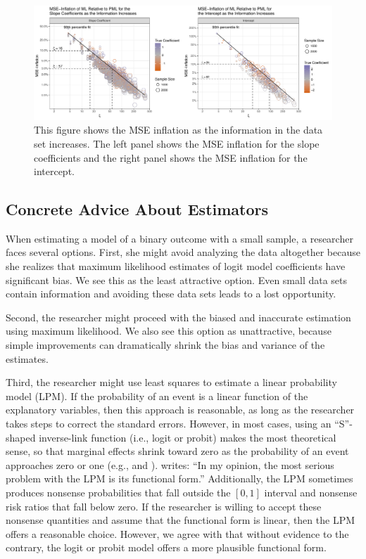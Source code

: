 \documentclass[12pt]{article}
\begin{document}
\begin{figure}[h]
\begin{center}
\includegraphics[width = \textwidth]{figs/mse-infl-larger-samples.pdf}
\caption{This figure shows the MSE inflation as the information in the data set increases. The left panel shows the MSE inflation for the slope coefficients and the right panel shows the MSE inflation for the intercept.}\label{fig:thresholds}
\end{center}
\end{figure}

\subsection*{Concrete Advice About Estimators}

When estimating a model of a binary outcome with a small sample, a researcher faces several options. 
First, she might avoid analyzing the data altogether because she realizes that maximum likelihood estimates of logit model coefficients have significant bias.
We see this as the least attractive option.
Even small data sets contain information and avoiding these data sets leads to a lost opportunity.

Second, the researcher might proceed with the biased and inaccurate estimation using maximum likelihood.
We also see this option as unattractive, because simple improvements can dramatically shrink the bias and variance of the estimates.

Third, the researcher might use least squares to estimate a linear probability model (LPM). If the probability of an event is a linear function of the explanatory variables, then this approach is reasonable, as long as the researcher takes steps to correct the standard errors.
However, in most cases, using an ``S''-shaped inverse-link function (i.e., logit or probit) makes the most theoretical sense, so that marginal effects shrink toward zero as the probability of an event approaches zero or one (e.g.,
\citealt{BerryDeMerittEsarey2010} and \citealt[pp. 34-47]{Long1997}).
\citet[p. 40]{Long1997} writes: ``In my opinion, the most serious problem with the LPM is its functional form.''
Additionally, the LPM sometimes produces nonsense probabilities that fall outside the $[0, 1]$ interval and nonsense risk ratios that fall below zero.
If the researcher is willing to accept these nonsense quantities and assume that the functional form is linear, then the LPM offers a reasonable choice.
However, we agree with \cite{Long1997} that without evidence to the contrary, the logit or probit model offers a more plausible functional form.
\end{document}

